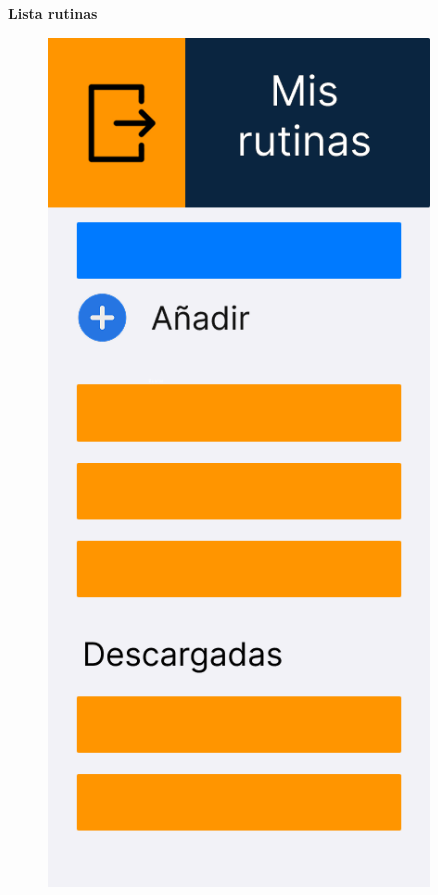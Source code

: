 \newpage

\textbf{Lista rutinas}

\begin{figure}[H]
   \centering
   \begin{minipage}{0.45\textwidth}
      \centering
      \includegraphics[width=0.9\textwidth]{fotos/Frame 46.png}

\end{minipage}
\end{figure}

